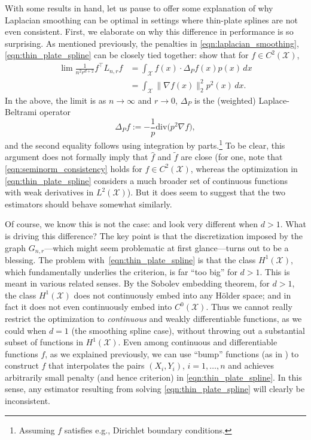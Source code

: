 \documentclass[twoside]{article}
\newcommand{\1}{\mathbf{1}}
\newcommand{\Lap}{L}
\newcommand{\Xset}{\mathcal{X}}
\newcommand{\Leb}{L}
\newcommand{\dive}{\mathrm{div}}
\newcommand{\wt}[1]{\widetilde{#1}}
\newcommand{\wh}[1]{\widehat{#1}}
\theoremstyle{definition}
\theoremstyle{remark}
\begin{document}
With some results in hand, let us pause to offer some explanation of why Laplacian smoothing can be optimal in settings where thin-plate splines are not even consistent. First, we elaborate on why this difference in performance is so surprising. As mentioned previously, the penalties in \eqref{eqn:laplacian_smoothing}, \eqref{eqn:thin_plate_spline} can be closely tied together: \citet{bousquet03} show that for $f \in C^2(\Xset)$, 
\begin{equation}
\label{eqn:seminorm_consistency}
\begin{aligned}
\lim \frac{1}{n^2 r^{d + 2}} f^\top \Lap_{n,r} f & = \int_{\Xset} f(x) \cdot \Delta_Pf(x) p(x) \,dx \\
& = \int_{\Xset} \|\nabla f(x)\|_2^2 p^2(x) \,dx.
\end{aligned}
\end{equation}
In the above, the limit is as $n \to \infty$ and $r \to 0$, $\Delta_P$ is the (weighted) Laplace-Beltrami operator
\begin{equation*}
\Delta_Pf := -\frac{1}{p} \dive\bigl(p^2\nabla f),
\end{equation*}
and the second equality follows using integration by parts.\footnote{Assuming $f$ satisfies e.g., Dirichlet boundary conditions.} To be clear, this argument does not formally imply that $\wh{f}$ and $\wt{f}$ are close (for one, note that \eqref{eqn:seminorm_consistency} holds for $f \in C^2(\Xset)$, whereas the optimization in \eqref{eqn:thin_plate_spline} considers a much broader set of continuous functions with weak derivatives in $\Leb^2(\Xset)$). But it does seem to suggest that the two estimators should behave somewhat similarly. 

Of course, we know this is not the case: \smash{$\wh{f}$} and \smash{$\wt{f}$} look very different when $d > 1$. What is driving this difference? The key point is that the discretization imposed by the graph $G_{n,r}$---which might seem problematic at first glance---turns out to be a blessing. The problem with~\eqref{eqn:thin_plate_spline} is that the class $H^1(\Xset)$, which fundamentally underlies the criterion, is far ``too big'' for $d > 1$. This is meant in various related senses. By the Sobolev embedding theorem, for $d>1$, the class $H^1(\Xset)$ does not continuously embed into any H\"{o}lder space; and in fact it does not even continuously embed into $C^0(\Xset)$. Thus we cannot really restrict the optimization to \emph{continuous} and weakly differentiable functions, as we could when $d=1$ (the smoothing spline case), without throwing out a substantial subset of functions in $H^1(\Xset)$. Even among continuous and differentiable functions $f$, as we explained previously, we can use ``bump'' functions (as in \citet{green93}) to construct $f$ that interpolates the pairs $(X_i,Y_i)$, $i=1,\ldots,n$ and achieves arbitrarily small penalty (and hence criterion) in \eqref{eqn:thin_plate_spline}. In this sense, any estimator resulting from solving \eqref{eqn:thin_plate_spline} will clearly be inconsistent. 
\end{document}
